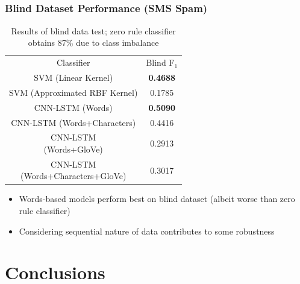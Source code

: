 \documentclass{beamer}
\begin{document}
\subsection{}
\begin{framefont}{\footnotesize}
	\begin{frame}
		\frametitle{Blind Dataset Performance (SMS Spam)}
		\begin{table}
			\centering
			\bgroup
			\def\arraystretch{1.5}
			\begin{tabular}{|c|c|} \hline
				Classifier & Blind F$_1$ \\ \hhline{|=|=|}
				SVM (Linear Kernel) & \textbf{0.4688}  \\ \hline
				SVM (Approximated RBF Kernel) & 0.1785 \\ \hline
				CNN-LSTM (Words) & \textbf{0.5090} \\ \hline
				CNN-LSTM (Words+Characters) & 0.4416 \\ \hline
				\makecell{CNN-LSTM \\(Words+GloVe)} & 0.2913  \\ \hline
				\makecell{CNN-LSTM \\(Words+Characters+GloVe)} & 0.3017  \\ \hline
			\end{tabular}
			\egroup
			\caption{Results of blind data test; zero rule classifier obtains 87\% due to class imbalance}
		\end{table}
		\vspace{-10pt}
		\begin{itemize}
			\item Words-based models perform best on blind dataset (albeit worse than zero rule classifier)
			\item Considering sequential nature of data contributes to some robustness
		\end{itemize}
	\end{frame}
\end{framefont}

\section{Conclusions}
\end{document}

